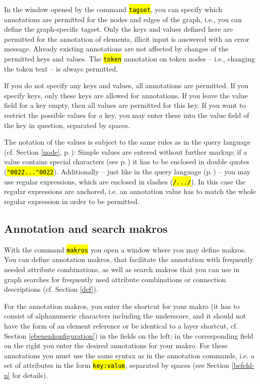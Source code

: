 \documentclass[12pt]{scrartcl}
\newcommand{\quo}{\char"0022}
\newcommand{\code}[1]{\hl{\texttt{#1}}}
\begin{document}
In the window opened by the command \code{tagset}, you can specify which annotations are permitted for the nodes and edges of the graph, i.e., you can define the graph-specific tagset.
Only the keys and values defined here are permitted for the annotation of elements, illicit input is answered with an error message.
Already existing annotations are not affected by changes of the permitted keys and values.
The \code{token} annotation on token nodes – i.e., changing the token text – is always permitted.

If you do not specify any keys and values, all annotations are permitted.
If you specify keys, only these keys are allowed for annotations.
If you leave the value field for a key empty, then all values are permitted for this key.
If you want to restrict the possible values for a key, you may enter these into the value field of the key in question, separated by spaces.

The notation of the values is subject to the same rules as in the query language (cf. Section \ref{node}, p.\,\pageref{zeichenketten}):
Simple values are entered without further markup; if a value contains special characters (see p.\,\pageref{zeichenketten}) it has to be enclosed in double quotes (\code{\quo...\quo}).
Additionally – just like in the query language (p.\,\pageref{zeichenketten}) – you may use regular expressions, which are enclosed in slashes (\code{/.../}).
In this case the regular expressions are anchored, i.e. an annotation value has to match the whole regular expression in order to be permitted.


\subsection{Annotation and search makros}\label{annotationsmakros}

With the command \code{makros} you open a window where you may define makros.
You can define annotation makros, that facilitate the annotation with frequently needed attribute combinations, as well as search makros that you can use in graph searches for frequently used attribute combinations or connection descriptions (cf. Section \ref{def}).

For the annotation makros, you enter the shortcut for your makro (it has to consist of alphanumeric characters including the underscore, and it should not have the form of an element reference or be identical to a layer shortcut, cf. Section \ref{ebenenkonfiguration}) in the fields on the left; in the corresponding field on the right you enter the desired annotations for your makro.
For these annotations you must use the same syntax as in the annotation commands, i.e. a set of attributes in the form \code{key:value}, separated by spaces (see Section \ref{befehl-n} for details).
\end{document}
